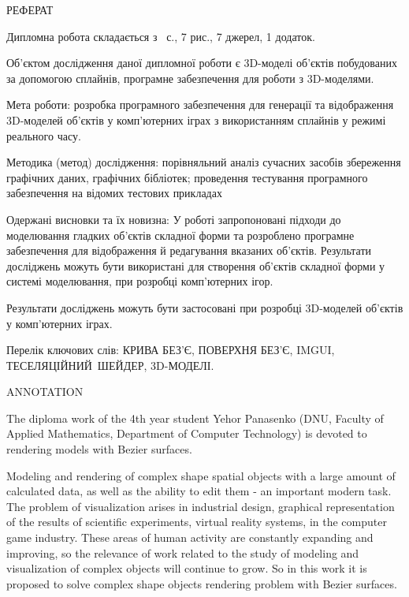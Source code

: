 \let\mypdfximage\pdfximage\def\pdfximage{\immediate\mypdfximage}\documentclass[14pt,a4paper]{extarticle}
\title{}
\author{}
\date{}
\theoremstyle{definition}
\renewcommand{\[}{\begin{singlespace}\begin{equation*}}
\renewcommand{\]}{\end{equation*}\end{singlespace}}
\renewcommand{\+}{\discretionary{\mbox{\scriptsize$\hookleftarrow$}}{}{}}
\begin{document}
\captionsetup[figure]{format=plain,labelsep=endash,labelfont=normalfont,textfont=normalfont}
\sloppy %
\allowdisplaybreaks %



\thispagestyle{empty}
\begin{center}
РЕФЕРАТ
\end{center}


Дипломна робота складається з~\pageref{lastpage} с., 7 рис., 7 джерел, 1 додаток.

Об'єктом дослідження даної дипломної роботи є 3D-моделі об'єктів побудованих за допомогою сплайнів, програмне забезпечення для роботи з 3D-моделями.

Мета роботи: розробка програмного забезпечення для генерації та відображення 3D-моделей об'єктів у комп'ютерних іграх з використанням сплайнів у режимі реального часу.

Методика (метод) дослідження: порівняльний аналіз  сучасних засобів збереження графічних даних, графічних бібліотек; проведення тестування програмного забезпечення на відомих тестових прикладах

Одержані висновки та їх новизна: У роботі запропоновані підходи до моделювання гладких об'єктів складної форми та розроблено програмне забезпечення для відображення й редагування вказаних об'єктів. Результати досліджень можуть бути використані для створення об'єктів складної форми у системі моделювання, при розробці комп'ютерних ігор.

Результати досліджень можуть бути застосовані при розробці 3D-моделей об'єктів у комп'ютерних іграх.

Перелік ключових слів: КРИВА БЕЗ'Є, ПОВЕРХНЯ БЕЗ'Є, IMGUI, ТЕСЕЛЯЦІЙНИЙ ШЕЙДЕР, 3D-МОДЕЛІ.

\newpage

\begin{center}
ANNOTATION
\end{center}

The diploma work of the 4th year student Yehor Panasenko (DNU, Faculty of Applied Mathematics, Department of Computer Technology) is devoted to rendering models with Bezier surfaces.

Modeling and rendering of complex shape spatial objects with a large amount of calculated data, as well as the ability to edit them - an important modern task. The problem of visualization arises in industrial design, graphical representation of the results of scientific experiments, virtual reality systems, in the computer game industry. These areas of human activity are constantly expanding and improving, so the relevance of work related to the study of modeling and visualization of complex objects will continue to grow. So in this work it is proposed to solve complex shape objects rendering problem with Bezier surfaces.
\end{document}
